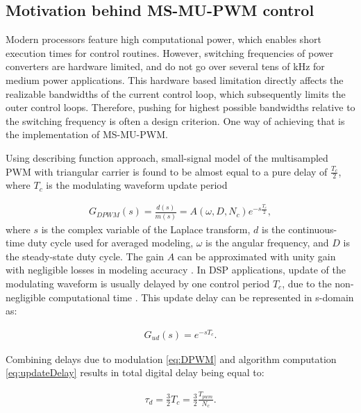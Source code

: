 \documentclass[conference]{IEEEtran}
\begin{document}
\subsection{Motivation behind MS-MU-PWM control}

Modern processors feature high computational power, which enables short execution times for control routines. However, switching frequencies of power converters are hardware limited, and do not go over several tens of kHz for medium power applications. This hardware based limitation directly affects the realizable bandwidths of the current control loop, which subsequently limits the outer control loops. Therefore, pushing for highest possible bandwidths relative to the switching frequency is often a design criterion. One way of achieving that is the implementation of MS-MU-PWM.

Using describing function approach, small-signal model of the multisampled PWM with triangular carrier is found to be almost equal to a pure delay of $\frac{T_c}{2}$, where $T_c$ is the modulating waveform update period \cite{corradini2018}

\begin{equation}
\begin{aligned}
G_{DPWM} (s) = \frac{d(s)}{m(s)} = A(\omega,D,N_c) e^{-s\frac{T_c}{2}},
\label{eq:DPWM} 
\end{aligned}    
\end{equation}
where $s$ is the complex variable of the Laplace transform, $d$ is the continuous-time duty cycle used for averaged modeling, $\omega$ is the angular frequency, and $D$ is the steady-state duty cycle. The gain $A$ can be approximated with unity gain with negligible losses in modeling accuracy \cite{corradini2018}.
In DSP applications, update of the modulating waveform is usually delayed by one control period $T_c$, due to the non-negligible computational time \cite{Buso2015}. This update delay can be represented in s-domain as:

\begin{equation}
\begin{aligned}
G_{ud} (s) = e^{-sT_c}.
\label{eq:updateDelay} 
\end{aligned} 
\end{equation}

Combining delays due to modulation \eqref{eq:DPWM} and algorithm computation \eqref{eq:updateDelay} results in total digital delay being equal to:

\begin{equation}
\begin{aligned}
\tau_{d} = \frac{3}{2}T_c = \frac{3}{2} \frac{T_{pwm}}{N_c}.
\label{eq:tauD} 
\end{aligned}    
\end{equation}
\end{document}
